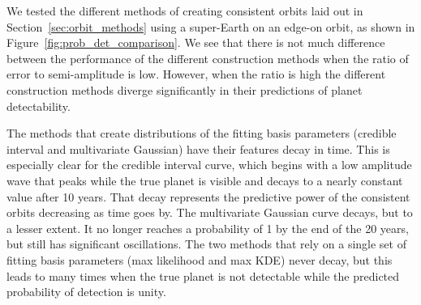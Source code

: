 We tested the different methods of creating consistent orbits laid out in
Section~\ref{sec:orbit_methods} using a super-Earth on an edge-on orbit, as shown in
Figure~\ref{fig:prob_det_comparison}. We see that there is not much difference between the
performance of the different construction methods when the ratio of error to semi-amplitude is low.
However, when the ratio is high the different construction methods diverge significantly in their
predictions of planet detectability.

The methods that create distributions of the fitting basis parameters (credible interval and
multivariate Gaussian) have their features decay in time.  This is especially clear for the credible
interval curve, which begins with a low amplitude wave that peaks while the true planet is visible
and decays to a nearly constant value after 10 years. That decay represents the predictive power of
the consistent orbits decreasing as time goes by. The multivariate Gaussian curve decays, but to a
lesser extent.  It no longer reaches a probability of 1 by the end of the 20 years, but still
has significant oscillations.  The two methods that rely on a single set of fitting basis parameters
(max likelihood and max KDE) never decay, but this leads to many times when the true planet is not
detectable while the predicted probability of detection is unity.


